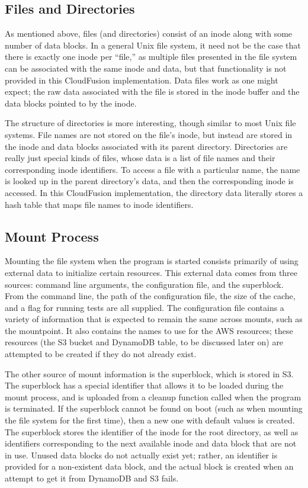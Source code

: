 \documentclass[11pt]{article}
\begin{document}
\subsection{Files and Directories}
As mentioned above, files (and directories) consist of an inode along with some number of data blocks. In a general Unix file system, it need not be the case that there is exactly one inode per ``file,'' as multiple files presented in the file system can be associated with the same inode and data, but that functionality is not provided in this CloudFusion implementation. Data files work as one might expect; the raw data associated with the file is stored in the inode buffer and the data blocks pointed to by the inode.

The structure of directories is more interesting, though similar to most Unix file systems. File names are not stored on the file's inode, but instead are stored in the inode and data blocks associated with its parent directory. Directories are really just special kinds of files, whose data is a list of file names and their corresponding inode identifiers. To access a file with a particular name, the name is looked up in the parent directory's data, and then the corresponding inode is accessed. In this CloudFusion implementation, the directory data literally stores a hash table that maps file names to inode identifiers.

\subsection{Mount Process}
Mounting the file system when the program is started consists primarily of using external data to initialize certain resources. This external data comes from three sources: command line arguments, the configuration file, and the superblock. From the command line, the path of the configuration file, the size of the cache, and a flag for running tests are all supplied. The configuration file contains a variety of information that is expected to remain the same across mounts, such as the mountpoint. It also contains the names to use for the AWS resources; these resources (the S3 bucket and DynamoDB table, to be discussed later on) are attempted to be created if they do not already exist.

The other source of mount information is the superblock, which is stored in S3. The superblock has a special identifier that allows it to be loaded during the mount process, and is uploaded from a cleanup function called when the program is terminated. If the superblock cannot be found on boot (such as when mounting the file system for the first time), then a new one with default values is created. The superblock stores the identifier of the inode for the root directory, as well as identifiers corresponding to the next available inode and data block that are not in use. Unused data blocks do not actually exist yet; rather, an identifier is provided for a non-existent data block, and the actual block is created when an attempt to get it from DynamoDB and S3 fails.
\end{document}
